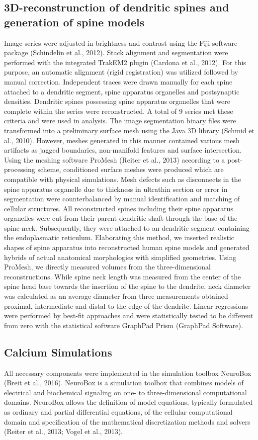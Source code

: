 \documentclass[fleqn,12pt]{wlscirep}
\begin{document}
\subsection*{3D-reconstrunction of dendritic spines and generation of spine models} Image series were adjusted in brightness and contrast using the Fiji software package (Schindelin et al., 2012). Stack alignment and segmentation were performed with the integrated TrakEM2 plugin (Cardona et al., 2012). For this purpose, an automatic alignment (rigid registration) was utilized followed by manual correction. Independent traces were drawn manually for each spine attached to a dendritic segment, spine apparatus organelles and postsynaptic densities. Dendritic spines possessing spine apparatus organelles that were complete within the series were reconstructed. A total of 9 series met these criteria and were used in analysis. The image segmentation binary files were transformed into a preliminary surface mesh using the Java 3D library (Schmid et al., 2010). However, meshes generated in this manner contained various mesh artifacts as jagged boundaries, non-manifold features and surface intersection. Using the meshing software ProMesh (Reiter et al., 2013) according to a post-processing scheme, conditioned surface meshes were produced which are compatible with physical simulations. Mesh defects such as disconnects in the spine apparatus organelle due to thickness in ultrathin section or error in segmentation were counterbalanced by manual identification and matching of cellular structures. All reconstructed spines including their spine apparatus organelles were cut from their parent dendritic shaft through the base of the spine neck. Subsequently, they were attached to an dendritic segment containing the endoplasmatic reticulum. Elaborating this method, we inserted realistic shapes of spine apparatus into reconstructed human spine models and generated hybrids of actual anatomical morphologies with simplified geometries. Using ProMesh, we directly measured volumes from the three-dimensional reconstructions. While spine neck length was measured from the center of the spine head base towards the insertion of the spine to the dendrite, neck diameter was calculated as an average diameter from three measurements obtained proximal, intermediate and distal to the edge of the dendrite. Linear regressions were performed by best-fit approaches and were statistically tested to be different from zero with the statistical software GraphPad Prism (GraphPad Software).
\subsection*{Calcium Simulations} All necessary components were implemented in the simulation toolbox NeuroBox (Breit et al., 2016). NeuroBox is a simulation toolbox that combines models of electrical and biochemical signaling on one- to three-dimensional computational domains. NeuroBox allows the definition of model equations, typically formulated as ordinary and partial differential equations, of the cellular computational domain and specification of the mathematical discretization methods and solvers (Reiter et al., 2013; Vogel et al., 2013). 
\end{document}
